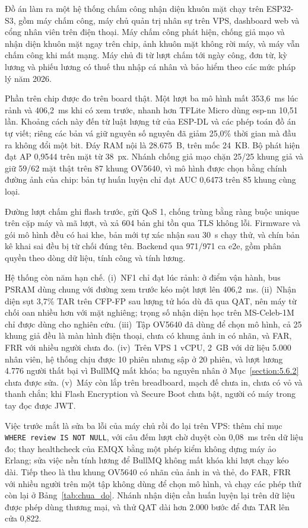 \documentclass[../DoAn.tex]{subfiles}
\begin{document}
Đồ án làm ra một hệ thống chấm công nhận diện khuôn mặt chạy trên ESP32-S3, gồm máy chấm công, máy chủ quản trị nhân sự
trên VPS, dashboard web và cổng nhân viên trên điện thoại. Máy chấm công phát hiện, chống giả mạo và nhận diện khuôn mặt
ngay trên chip, ảnh khuôn mặt không rời máy, và máy vẫn chấm công khi mất mạng. Máy chủ đi từ lượt chấm tới ngày công,
đơn từ, kỳ lương và phiếu lương có thuế thu nhập cá nhân và bảo hiểm theo các mức pháp lý năm 2026.

Phần trên chip được đo trên board thật. Một lượt ba mô hình mất 353,6~ms lúc rảnh và 406,2~ms khi có xem trước, nhanh hơn
TFLite Micro dùng esp-nn 10,51 lần. Khoảng cách này đến từ luật lượng tử của ESP-DL và các phép toán đồ án tự viết; riêng
các bản vá giữ nguyên số nguyên đã giảm 25,0\% thời gian mà đầu ra không đổi một bit. Đáy RAM nội là 28.675~B, trên mốc
24~KB. Bộ phát hiện đạt AP 0,9544 trên mặt từ 38~px. Nhánh chống giả mạo chặn 25/25 khung giả và giữ 59/62 mặt thật trên
87 khung OV5640, vì mô hình được chọn bằng chính đường ảnh của chip: bản tự huấn luyện chỉ đạt AUC 0,6473 trên
85 khung cùng loại.

Đường lượt chấm ghi flash trước, gửi QoS 1, chống trùng bằng ràng buộc unique trên cặp máy và mã lượt, và xả 604 bản ghi
tồn qua TLS không lỗi. Firmware và gói mô hình đều có hai khe, bản mới tự xác nhận sau 30~s chạy thử, và chín bản kê
khai sai đều bị từ chối đúng tên. Backend qua 971/971 ca e2e, gồm phân quyền theo dòng dữ liệu, tính công và tính
lương.

Hệ thống còn năm hạn chế. (i)~NF1 chỉ đạt lúc rảnh: ở điểm vận hành, bus PSRAM dùng chung với đường xem trước kéo một lượt
lên 406,2~ms. (ii)~Nhận diện sụt 3,7\% TAR trên CFP-FP sau lượng tử hóa dù đã qua QAT, nên máy từ chối oan nhiều hơn với
mặt nghiêng; trọng số nhận diện học trên MS-Celeb-1M chỉ được dùng cho nghiên cứu. (iii)~Tập OV5640 đã dùng để chọn mô
hình, cả 25 khung giả đều là màn hình điện thoại, chưa có khung ảnh in có nhãn, và FAR, FRR với nhiều người chưa đo. (iv)~Trên
VPS 1 vCPU, 2~GB với dữ liệu 5.000 nhân viên, hệ thống chịu được 10 phiên nhưng sập ở 20 phiên, và lượt lương 4.776 người
thất bại vì BullMQ mất khóa; ba nguyên nhân ở Mục~\ref{section:5.6.2} chưa được sửa. (v)~Máy còn lắp trên breadboard,
mạch đế chưa in, chưa có vỏ và thanh chắn; khi Flash Encryption và Secure Boot chưa bật, người có máy trong tay đọc được JWT.

Việc trước mắt là sửa ba lỗi của máy chủ rồi đo lại trên VPS: thêm chỉ mục \texttt{WHERE review IS NOT NULL}, với câu đếm
lượt chờ duyệt còn 0,08~ms trên dữ liệu đo; thay healthcheck của EMQX bằng một phép kiểm không dựng máy ảo Erlang; sửa việc
nền tính lương để BullMQ không mất khóa khi lượt chạy kéo dài. Tiếp theo là thu khung OV5640 có nhãn của ảnh in và thẻ,
đo FAR, FRR với nhiều người trên một tập không dùng để chọn mô hình, và chạy các phép thử còn lại ở
Bảng~\ref{tab:chua_do}. Nhánh nhận diện cần huấn luyện lại trên dữ liệu được phép dùng thương mại, và thử QAT dài hơn
2.000 bước để đưa TAR lên cửa 0,822.
\end{document}
